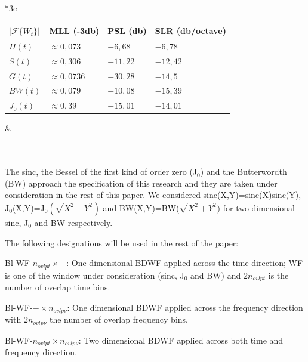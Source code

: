 \documentclass[useAMS,usenatbib]{mn2e}
\begin{document}
\begin{tabular}{*3{c}}
 \\
 \hspace{-1cm}\begin{tabular}{|l|l|l|l|}
  \hline
  \footnotesize $|\mathcal{F}\Big\{W_{t}\Big\}|$ &\textbf{\footnotesize MLL (-3db)}&\textbf{\footnotesize PSL (db)} &\textbf{\footnotesize 
SLR (db/octave) }  \\
  \hline\hline
  {\footnotesize $\Pi(t)$} &{\footnotesize $\approx 0,073$} &{\footnotesize $-6,68$}&{\footnotesize 
$-6,78$}\\
  {\footnotesize $S(t)$} &{\footnotesize  $\approx0,306$}&{\footnotesize  $-11,22$}&{\footnotesize  
$-12,42$} \\
  {\footnotesize $G(t)$} & {\footnotesize $\approx0,0736$}&{\footnotesize  $-30,28$}&{\footnotesize  $-14,5$}\\ 
  {\footnotesize $BW(t)$} &{\footnotesize  $\approx0,079$} &{\footnotesize $-10,08$ }&{\footnotesize  $-15,39$}\\
  {\footnotesize $J_0(t)$} &{\footnotesize  $\approx 0,39$} &{\footnotesize $ -15,01$ }&{\footnotesize  $ -14,01$}
  \end{tabular}& \label{BDWBnoise}
\end{tabular}\\
\\

\hspace{-0.6cm}The sinc, the Bessel of the first kind of order zero (J$_0$) and the Butterwordth (BW)  
approach the specification of this 
research and they are taken under consideration in the rest of this paper.  We considered sinc(X,Y)=sinc(X)sinc(Y), 
J$_0$(X,Y)=J$_0(\sqrt{X^2 + Y^2})$ and BW(X,Y)=BW($\sqrt{X^2 + Y^2})$ for  two dimensional 
sinc, J$_0$ and BW respectively.





The following designations will be used in the rest of the paper:

Bl-WF-$n_{ovlpt}\times -$: One dimensional BDWF applied across the time direction; WF is one of the window under 
consideration (sinc, J$_0$ and BW) and $2n_{ovlpt}$ is the number of overlap time bins.

Bl-WF-$-\times n_{ovlp\nu}$: One dimensional BDWF applied across the frequency direction with $2n_{ovlp\nu}$ the number of overlap 
frequency bins.

Bl-WF-$n_{ovlpt}\times n_{ovlp\nu}$: Two dimensional BDWF applied across both time and frequency direction.
\end{document}
